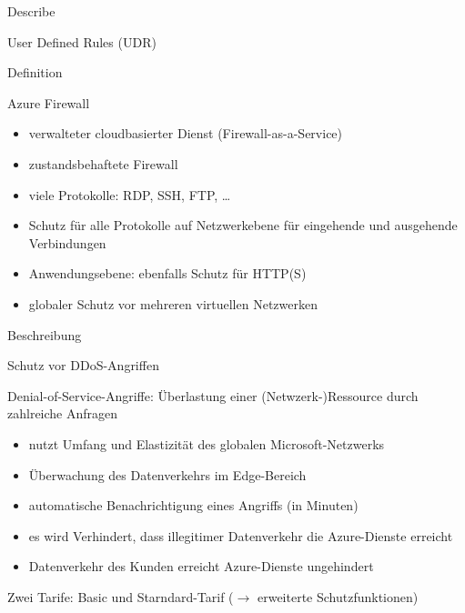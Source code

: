 \documentclass{scrartcl}
\newenvironment{flashcard}[2][]{%
    #1
    \vfill
    \centerline{\Large{#2}}
    \vfill
\newpage
}
{\newpage}
\begin{document}
    \begin{flashcard}[Describe]{User Defined Rules (UDR)}

    \end{flashcard}

    \begin{flashcard}[Definition]{Azure Firewall}
        \begin{itemize}
            \item verwalteter cloudbasierter Dienst (Firewall-as-a-Service)
            \item zustandsbehaftete Firewall
            \item viele Protokolle: RDP, SSH, FTP, \ldots
            \item Schutz für alle Protokolle auf Netzwerkebene für eingehende und ausgehende Verbindungen
            \item Anwendungsebene: ebenfalls Schutz für HTTP(S)
            \item globaler Schutz vor mehreren virtuellen Netzwerken
        \end{itemize}

    \end{flashcard}

    \begin{flashcard}[Beschreibung]{Schutz vor DDoS-Angriffen}
        Denial-of-Service-Angriffe: Überlastung einer (Netwzerk-)Ressource durch zahlreiche Anfragen
        \begin{itemize}
            \item nutzt Umfang und Elastizität des globalen Microsoft-Netzwerks
            \item Überwachung des Datenverkehrs im Edge-Bereich
            \item automatische Benachrichtigung eines Angriffs (in Minuten)
            \item es wird Verhindert, dass illegitimer Datenverkehr die Azure-Dienste erreicht
            \item Datenverkehr des Kunden erreicht Azure-Dienste ungehindert
        \end{itemize}
        Zwei Tarife: Basic und Starndard-Tarif ($\rightarrow$ erweiterte Schutzfunktionen)
    \end{flashcard}
\end{document}
